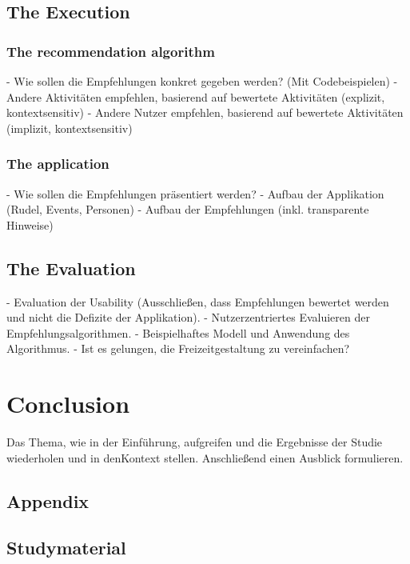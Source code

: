 \documentclass[12pt,numbers=noenddot,parskip,bibliography=totocnumbered,listof=totocnumbered]{scrreprt}
\begin{document}
\section{The Execution}
\subsection{The recommendation algorithm}
- Wie sollen die Empfehlungen konkret gegeben werden? (Mit Codebeispielen)
	- Andere Aktivitäten empfehlen, basierend auf bewertete Aktivitäten (explizit, kontextsensitiv)
	- Andere Nutzer empfehlen, basierend auf bewertete Aktivitäten (implizit, kontextsensitiv)
\subsection{The application}
- Wie sollen die Empfehlungen präsentiert werden?
	- Aufbau der Applikation (Rudel, Events, Personen)
	- Aufbau der Empfehlungen (inkl. transparente Hinweise)
\section{The Evaluation}
- Evaluation der Usability (Ausschließen, dass Empfehlungen bewertet werden und nicht die Defizite der Applikation).
- Nutzerzentriertes Evaluieren der Empfehlungsalgorithmen.
- Beispielhaftes Modell und Anwendung des Algorithmus.
- Ist es gelungen, die Freizeitgestaltung zu vereinfachen?

\chapter{Conclusion}
Das Thema, wie in der Einführung, aufgreifen und die Ergebnisse der Studie wiederholen und in denKontext stellen. Anschließend einen Ausblick formulieren.

\begin{appendix} 
\chapter{Appendix}
\newpage
\section{Studymaterial}
\vspace*{\fill}
\label{lab:Studymaterial}
\vspace*{\fill}
\end{appendix}
\end{document}
